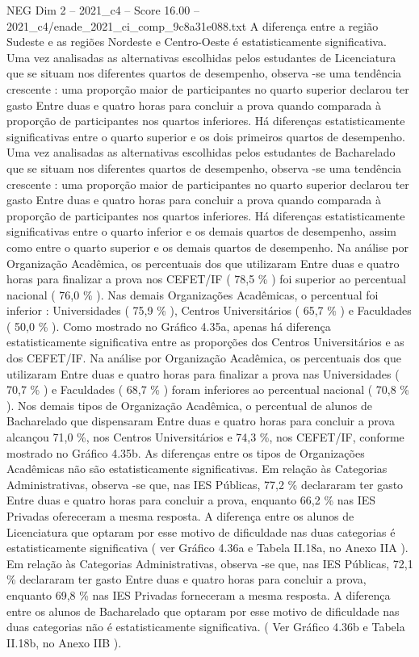 \begin{textsample}{NEG Dim 2 – 2021\_c4 – Score 16.00 – 2021\_c4/enade\_2021\_ci\_comp\_9c8a31e088.txt}
A diferença entre a região Sudeste e as regiões Nordeste e Centro-Oeste é estatisticamente significativa.
Uma vez analisadas as alternativas escolhidas pelos estudantes de Licenciatura que se situam nos diferentes quartos de desempenho, observa -se uma tendência crescente : uma proporção maior de participantes no quarto superior declarou ter gasto Entre duas e quatro horas para concluir a prova quando comparada à proporção de participantes nos quartos inferiores.
Há diferenças estatisticamente significativas entre o quarto superior e os dois primeiros quartos de desempenho.
Uma vez analisadas as alternativas escolhidas pelos estudantes de Bacharelado que se situam nos diferentes quartos de desempenho, observa -se uma tendência crescente : uma proporção maior de participantes no quarto superior declarou ter gasto Entre duas e quatro horas para concluir a prova quando comparada à proporção de participantes nos quartos inferiores.
Há diferenças estatisticamente significativas entre o quarto inferior e os demais quartos de desempenho, assim como entre o quarto superior e os demais quartos de desempenho.
Na análise por Organização Acadêmica, os percentuais dos que utilizaram Entre duas e quatro horas para finalizar a prova nos CEFET/IF ( 78,5 \% ) foi superior ao percentual nacional ( 76,0 \% ).
Nas demais Organizações Acadêmicas, o percentual foi inferior : Universidades ( 75,9 \% ), Centros Universitários ( 65,7 \% ) e Faculdades ( 50,0 \% ).
Como mostrado no Gráfico 4.35a, apenas há diferença estatisticamente significativa entre as proporções dos Centros Universitários e as dos CEFET/IF.
Na análise por Organização Acadêmica, os percentuais dos que utilizaram Entre duas e quatro horas para finalizar a prova nas Universidades ( 70,7 \% ) e Faculdades ( 68,7 \% ) foram inferiores ao percentual nacional ( 70,8 \% ).
Nos demais tipos de Organização Acadêmica, o percentual de alunos de Bacharelado que dispensaram Entre duas e quatro horas para concluir a prova alcançou 71,0 \%, nos Centros Universitários e 74,3 \%, nos CEFET/IF, conforme mostrado no Gráfico 4.35b.
As diferenças entre os tipos de Organizações Acadêmicas não são estatisticamente significativas.
Em relação às Categorias Administrativas, observa -se que, nas IES Públicas, 77,2 \% declararam ter gasto Entre duas e quatro horas para concluir a prova, enquanto 66,2 \% nas IES Privadas ofereceram a mesma resposta.
A diferença entre os alunos de Licenciatura que optaram por esse motivo de dificuldade nas duas categorias é estatisticamente significativa ( ver Gráfico 4.36a e Tabela II.18a, no Anexo IIA ).
Em relação às Categorias Administrativas, observa -se que, nas IES Públicas, 72,1 \% declararam ter gasto Entre duas e quatro horas para concluir a prova, enquanto 69,8 \% nas IES Privadas forneceram a mesma resposta.
A diferença entre os alunos de Bacharelado que optaram por esse motivo de dificuldade nas duas categorias não é estatisticamente significativa. ( Ver Gráfico 4.36b e Tabela II.18b, no Anexo IIB ).

\end{textsample}
